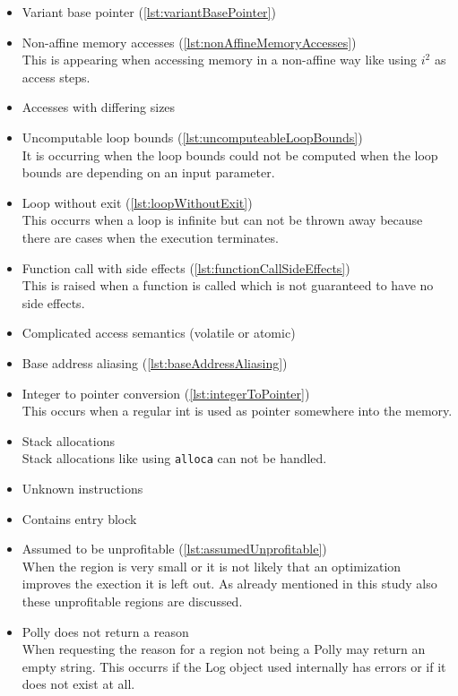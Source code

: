 \begin{itemize}
    \item Variant base pointer (\autoref{lst:variantBasePointer})\\
    \item Non-affine memory accesses (\autoref{lst:nonAffineMemoryAccesses})\\
        This is appearing when accessing memory in a non-affine way like using \(i^2\) as access steps.
    \item Accesses with differing sizes\\
    \item Uncomputable loop bounds (\autoref{lst:uncomputeableLoopBounds})\\
        It is occurring when the loop bounds could not be computed \eg when the loop bounds are depending on an input parameter.
    \item Loop without exit (\autoref{lst:loopWithoutExit})\\
        This occurrs when a loop is infinite but can not be thrown away because there are cases when the execution terminates.
    \item Function call with side effects (\autoref{lst:functionCallSideEffects})\\
        This is raised when a function is called which is not guaranteed to have no side effects.
    \item Complicated access semantics (volatile or atomic)\\
    \item Base address aliasing (\autoref{lst:baseAddressAliasing})\\
    \item Integer to pointer conversion (\autoref{lst:integerToPointer})\\
        This occurs when a regular int is used as pointer somewhere into the memory.
    \item Stack allocations\\
        Stack allocations like using \texttt{alloca} can not be handled.
    \item Unknown instructions\\
    \item Contains entry block\\
    \item Assumed to be unprofitable (\autoref{lst:assumedUnprofitable})\\
        When the region is very small or it is not likely that an optimization improves the exection it is left out.
        As already mentioned in this study also these unprofitable regions are discussed.
    \item Polly does not return a reason\\
        When requesting the reason for a region not being a \scop Polly may return an empty string.
        This occurrs if the Log object used internally has errors or if it does not exist at all.
\end{itemize}


